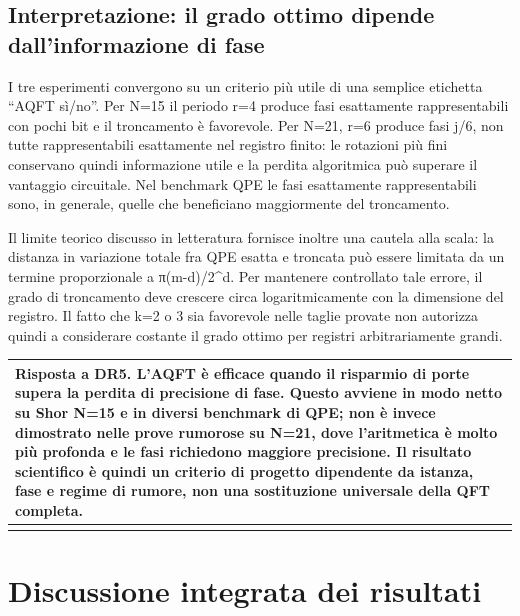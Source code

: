 \subsection{Interpretazione: il grado ottimo dipende dall'informazione di fase}\label{sec:finale_5_5_4}

I tre esperimenti convergono su un criterio più utile di una semplice etichetta ``AQFT sì/no''. Per N=15 il periodo r=4 produce fasi esattamente rappresentabili con pochi bit e il troncamento è favorevole. Per N=21, r=6 produce fasi j/6, non tutte rappresentabili esattamente nel registro finito: le rotazioni più fini conservano quindi informazione utile e la perdita algoritmica può superare il vantaggio circuitale. Nel benchmark QPE le fasi esattamente rappresentabili sono, in generale, quelle che beneficiano maggiormente del troncamento.

Il limite teorico discusso in letteratura \cite{barencoAQFT1996,akoramurthy2026} fornisce inoltre una cautela alla scala: la distanza in variazione totale fra QPE esatta e troncata può essere limitata da un termine proporzionale a π(m-d)/2\^{}d. Per mantenere controllato tale errore, il grado di troncamento deve crescere circa logaritmicamente con la dimensione del registro. Il fatto che k=2 o 3 sia favorevole nelle taglie provate non autorizza quindi a considerare costante il grado ottimo per registri arbitrariamente grandi.

{\def\LTcaptype{none} %
\begin{longtable}[]{@{}
  >{\raggedright\arraybackslash}p{}@{}}
\toprule\noalign{}
\begin{minipage}[b]{\linewidth}\raggedright
\textbf{Risposta a DR5.} L'AQFT è efficace quando il risparmio di porte supera la perdita di precisione di fase. Questo avviene in modo netto su Shor N=15 e in diversi benchmark di QPE; non è invece dimostrato nelle prove rumorose su N=21, dove l'aritmetica è molto più profonda e le fasi richiedono maggiore precisione. Il risultato scientifico è quindi un criterio di progetto dipendente da istanza, fase e regime di rumore, non una sostituzione universale della QFT completa.
\end{minipage} \\
\midrule\noalign{}
\endhead
\bottomrule\noalign{}
\endlastfoot
\end{longtable}
}

\section{Discussione integrata dei risultati}\label{sec:finale_5_6}

